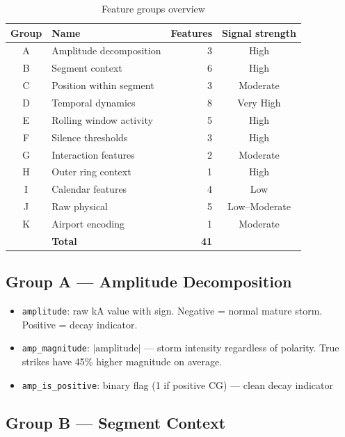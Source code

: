 \documentclass[12pt,a4paper]{article}
\begin{document}
\begin{table}[H]
\centering
\caption{Feature groups overview}
\label{tab:features_overview}
\begin{tabular}{clrc}
\toprule
\textbf{Group} & \textbf{Name} & \textbf{Features} & \textbf{Signal strength} \\
\midrule
A & Amplitude decomposition  & 3 & High \\
B & Segment context          & 6 & High \\
C & Position within segment  & 3 & Moderate \\
D & Temporal dynamics        & 8 & Very High \\
E & Rolling window activity  & 5 & High \\
F & Silence thresholds       & 3 & High \\
G & Interaction features     & 2 & Moderate \\
H & Outer ring context       & 1 & High \\
I & Calendar features        & 4 & Low \\
J & Raw physical             & 5 & Low--Moderate \\
K & Airport encoding         & 1 & Moderate \\
\midrule
  & \textbf{Total}           & \textbf{41} & \\
\bottomrule
\end{tabular}
\end{table}

\subsection{Group A — Amplitude Decomposition}

\begin{itemize}[leftmargin=1.5em]
  \item \texttt{amplitude}: raw kA value with sign. Negative = normal mature storm.
        Positive = decay indicator.
  \item \texttt{amp\_magnitude}: $|\text{amplitude}|$ — storm intensity regardless of polarity.
        True strikes have 45\% higher magnitude on average.
  \item \texttt{amp\_is\_positive}: binary flag (1 if positive CG) — clean decay indicator
\end{itemize}

\subsection{Group B — Segment Context}
\end{document}
